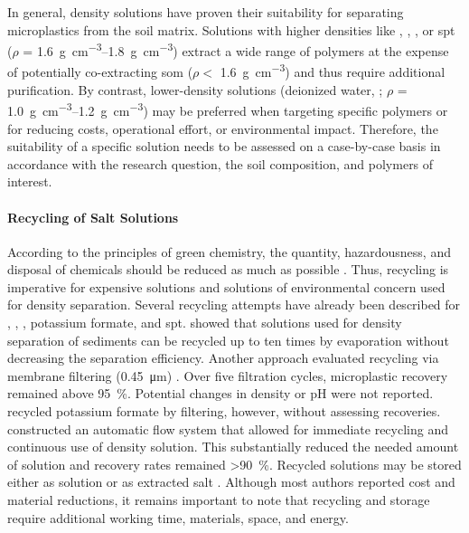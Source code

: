 In general, density solutions have proven their suitability for separating microplastics from the soil matrix. Solutions with higher densities like , , , or \ac{spt} ($\rho$ =
\SIrange{1.6}{1.8}{\gram\per\cubic\centi\meter}) extract a wide range of polymers at the expense of potentially co-extracting \ac{som} ($\rho <$
\SI{1.6}{\gram\per\cubic\centi\meter}) \citep{CerliSeparation2012} and thus require additional purification. By contrast, lower-density solutions (deionized water, ; $\rho$ = \SIrange{1.0}{1.2}{\gram\per\cubic\centi\meter}) may be preferred when targeting specific polymers or for reducing costs, operational effort, or environmental impact. Therefore, the suitability of a specific solution needs to be assessed on a case-by-case basis in accordance with the research question, the soil composition, and polymers of interest.

\paragraph{Recycling of Salt Solutions}

According to the principles of green chemistry, the quantity,
hazardousness, and disposal of chemicals should be reduced as much as possible \citep{AnastasGreen2009}. Thus, recycling is imperative
for expensive solutions and solutions of environmental concern used for density separation. Several recycling attempts have already been described for , , , potassium formate, and \ac{spt}.  showed that  solutions used for density separation of sediments can be recycled up to ten times by evaporation without decreasing the separation efficiency. Another approach evaluated  recycling via membrane filtering (\SI{0.45}{\micro\meter}) \citep{RodriguesImproving2020}. Over five filtration cycles,
microplastic recovery remained above \SI{95}{\percent}. Potential changes in density or pH were not reported.  recycled potassium formate by filtering, however, without assessing recoveries.  constructed an automatic flow system that allowed for immediate recycling and continuous use of density solution.
This substantially reduced the needed amount of  solution and recovery rates remained \SI{>90}{\percent}. Recycled solutions may be stored either as solution \citep{LiuMethod2019,RodriguesImproving2020} or as extracted salt \citep{KedzierskiEfficient2017}. Although most authors reported cost and material reductions, it remains important to note that recycling and storage require additional working time, materials, space, and energy.

